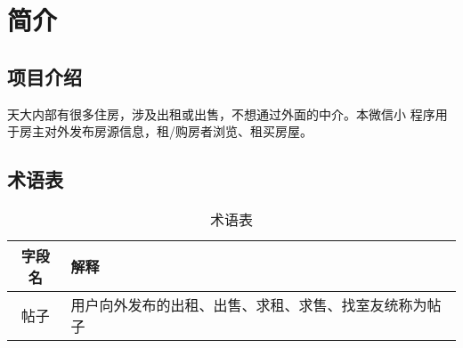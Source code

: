\chapter{简介}

\section{项目介绍}
天大内部有很多住房，涉及出租或出售，不想通过外面的中介。本微信小 程序用于房主对外发布房源信息，租/购房者浏览、租买房屋。

\section{术语表}

\begin{table}[htbp]
    \small  
    \begin{center}  
    \begin{tabular}{|c|l|} 
    \hline  
    字段名 & 解释  \\ 
    \hline  
    帖子 & 用户向外发布的出租、出售、求租、求售、找室友统称为帖子 \\  
    \hline 
    \end{tabular}  
    \end{center}
    \caption{术语表} 
    \end{table}
